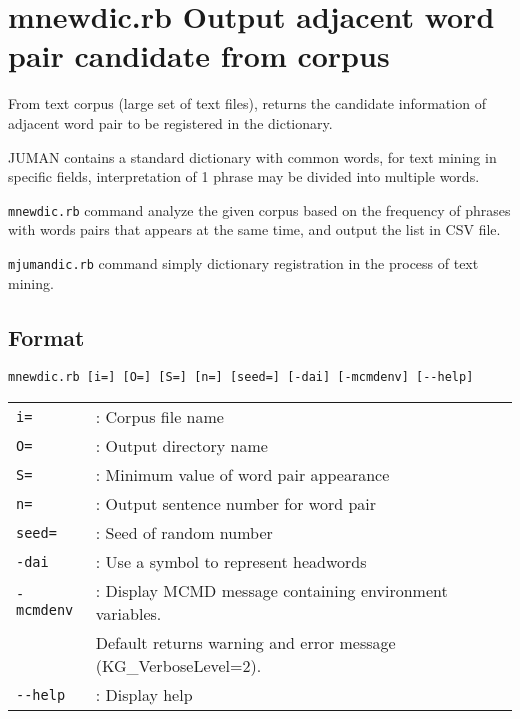 



\section{mnewdic.rb Output adjacent word pair candidate from corpus \label{sect:mnewdic}}

From text corpus  (large set of text files),  returns the candidate information of adjacent word pair to be registered in the dictionary. 

JUMAN contains a standard dictionary with  common words, for text mining in specific fields, interpretation of 1 phrase  may be divided into multiple words. 
    
\verb|mnewdic.rb| command analyze the given corpus based on the frequency of phrases with words pairs that appears at the same time, and output the list in CSV file. 

\verb|mjumandic.rb| command simply dictionary registration in the process of text mining.    


\subsection{Format}
\begin{verbatim}
mnewdic.rb [i=] [O=] [S=] [n=] [seed=] [-dai] [-mcmdenv] [--help]
\end{verbatim}

\begin{table}[htbp]
{\small
\begin{tabular}{ll}
\verb|i=|       & : Corpus file name  \\
\verb|O=|       & : Output directory name  \\
\verb|S=|       & : Minimum value of word pair appearance \\
\verb|n=|       & : Output sentence number for word pair  \\
\verb|seed=|    & : Seed of random number  \\
\verb|-dai|     & : Use a symbol to represent headwords  \\
\verb|-mcmdenv| & : Display MCMD message containing environment variables.  \\
                &    Default returns warning and error message  (KG\_VerboseLevel=2). \\
\verb|--help|   & : Display help   \\
\end{tabular} 
}
\end{table} 

